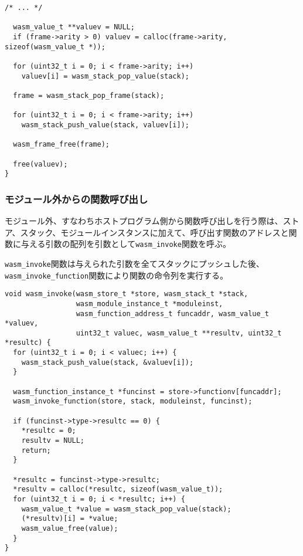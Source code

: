 \begin{lstlisting}[caption=関数の呼び出し,label=lst:parse_sleb128]
  /* ... */

  wasm_value_t **valuev = NULL;
  if (frame->arity > 0) valuev = calloc(frame->arity, sizeof(wasm_value_t *));

  for (uint32_t i = 0; i < frame->arity; i++)
    valuev[i] = wasm_stack_pop_value(stack);

  frame = wasm_stack_pop_frame(stack);

  for (uint32_t i = 0; i < frame->arity; i++)
    wasm_stack_push_value(stack, valuev[i]);

  wasm_frame_free(frame);

  free(valuev);
}
\end{lstlisting}

\subsubsection{モジュール外からの関数呼び出し}

モジュール外、すなわちホストプログラム側から関数呼び出しを行う際は、ストア、スタック、モジュールインスタンスに加えて、呼び出す関数のアドレスと関数に与える引数の配列を引数として\verb|wasm_invoke|関数を呼ぶ。

\verb|wasm_invoke|関数は与えられた引数を全てスタックにプッシュした後、\verb|wasm_invoke_function|関数により関数の命令列を実行する。

\begin{lstlisting}[caption=モジュール外からの関数呼び出し,label=lst:parse_sleb128]
void wasm_invoke(wasm_store_t *store, wasm_stack_t *stack,
                 wasm_module_instance_t *moduleinst,
                 wasm_function_address_t funcaddr, wasm_value_t *valuev,
                 uint32_t valuec, wasm_value_t **resultv, uint32_t *resultc) {
  for (uint32_t i = 0; i < valuec; i++) {
    wasm_stack_push_value(stack, &valuev[i]);
  }

  wasm_function_instance_t *funcinst = store->functionv[funcaddr];
  wasm_invoke_function(store, stack, moduleinst, funcinst);

  if (funcinst->type->resultc == 0) {
    *resultc = 0;
    resultv = NULL;
    return;
  }

  *resultc = funcinst->type->resultc;
  *resultv = calloc(*resultc, sizeof(wasm_value_t));
  for (uint32_t i = 0; i < *resultc; i++) {
    wasm_value_t *value = wasm_stack_pop_value(stack);
    (*resultv)[i] = *value;
    wasm_value_free(value);
  }
}
\end{lstlisting}

